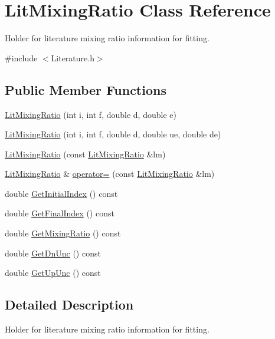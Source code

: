 \hypertarget{classLitMixingRatio}{\section{Lit\-Mixing\-Ratio Class Reference}
\label{classLitMixingRatio}
}


Holder for literature mixing ratio information for fitting.  




{\ttfamily \#include $<$Literature.\-h$>$}

\subsection*{Public Member Functions}
\begin{DoxyCompactItemize}
\item 
\hyperlink{classLitMixingRatio_acc81b7cc846a020243c5614b62e718e3}{Lit\-Mixing\-Ratio} (int i, int f, double d, double e)
\item 
\hyperlink{classLitMixingRatio_a647762d11abd8df832b8520e20a467ea}{Lit\-Mixing\-Ratio} (int i, int f, double d, double ue, double de)
\item 
\hyperlink{classLitMixingRatio_a091f73652ff6c8b44618cfa92b0c00af}{Lit\-Mixing\-Ratio} (const \hyperlink{classLitMixingRatio}{Lit\-Mixing\-Ratio} \&lm)
\item 
\hyperlink{classLitMixingRatio}{Lit\-Mixing\-Ratio} \& \hyperlink{classLitMixingRatio_a81ec58f8ca7d4e67b844293891a63fa9}{operator=} (const \hyperlink{classLitMixingRatio}{Lit\-Mixing\-Ratio} \&lm)
\item 
double \hyperlink{classLitMixingRatio_a0c62b693ea790373dde68c387d45a38e}{Get\-Initial\-Index} () const 
\item 
double \hyperlink{classLitMixingRatio_abda111abfec00d0ce4ae3aa409af22c6}{Get\-Final\-Index} () const 
\item 
double \hyperlink{classLitMixingRatio_afecebfa6f4469db8a059b9192c25c9b0}{Get\-Mixing\-Ratio} () const 
\item 
double \hyperlink{classLitMixingRatio_aa4506749342319dcd24dd9e6e6f4dbee}{Get\-Dn\-Unc} () const 
\item 
double \hyperlink{classLitMixingRatio_a919978e47969b8b575f1db57ea7bfbdc}{Get\-Up\-Unc} () const 
\end{DoxyCompactItemize}


\subsection{Detailed Description}
Holder for literature mixing ratio information for fitting. 

